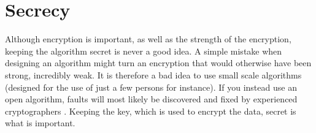 
\section{Secrecy}
Although encryption is important, as well as the strength of the 
encryption, keeping the algorithm secret is never a good idea. A simple 
mistake when designing an algorithm might turn an encryption that would 
otherwise have been strong, incredibly weak. It is therefore a bad 
idea to use small scale algorithms (designed for the use of just a few 
persons for instance). If you instead use an open algorithm, faults 
will most likely be discovered and fixed by experienced cryptographers 
\citep[pp. 23]{Schneier:2003}. Keeping the key, which is used to 
encrypt the data, secret is what is important.
